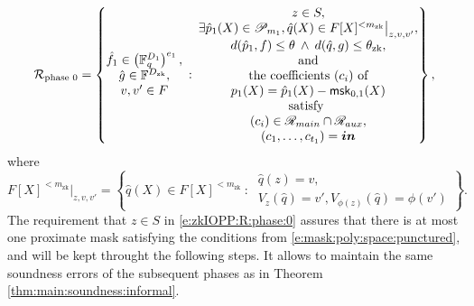 \begin{equation}
\label{e:zkIOPP:R:phase:0}
\mathcal R_\text{phase 0} = \left\{
    \begin{matrix}
    \hat f_1\in \left(\mathbb F_q^{D_1}\right)^{e_1}, 
    \\
    \hat g \in \mathbb F^{D_\text{zk}},
    \\
    v, v' \in F
    \end{matrix}
    \::\:
    \begin{matrix}
    z\in S, 
    \\
    \exists 
    \hat p_1(X) \in \mathscr P_{m_1}, 
    \hat q(X) \in F[X]^{< m_\text{zk}}\big|_{z,v,v'},
    \\
    d(\hat p_1, f) \leq \theta \:\wedge\: d(\hat q,g)\leq \theta_\text{zk},
    \\\text{and}
    \\
    \text{the coefficients $(c_i)$ of}
    \\
    p_1(X) = \hat p_1(X) - \msk_{0,1}(X)
    \\
    \text{satisfy 
    }
    \\
    (c_i)  \in \mathscr R_{main} \cap \mathscr R_{aux},
    \\
    (c_1,\ldots,c_{t_1}) = \vec{in}
    \end{matrix}
\right\},
\end{equation}
where 
\begin{equation}
\label{e:mask:poly:space:punctured}
F[X]^{<m_\text{zk}}\big|_{z,v,v'} = \left\{
\hat q(X)\in F[X]^{<m_\text{zk}} \::\:
\begin{matrix}
\hat q(z) = v, \\
V_z(\hat q) = v', V_{\phi(z)}(\hat q) = \phi(v')
\end{matrix}
\right\}.
\end{equation}
The requirement that $z\in S$ in \eqref{e:zkIOPP:R:phase:0} assures that there is at most one proximate mask satisfying the conditions from \eqref{e:mask:poly:space:punctured}, and will be kept throught the following steps. 
It allows to maintain the same soundness errors of the subsequent phases as in Theorem \ref{thm:main:soundness:informal}.



